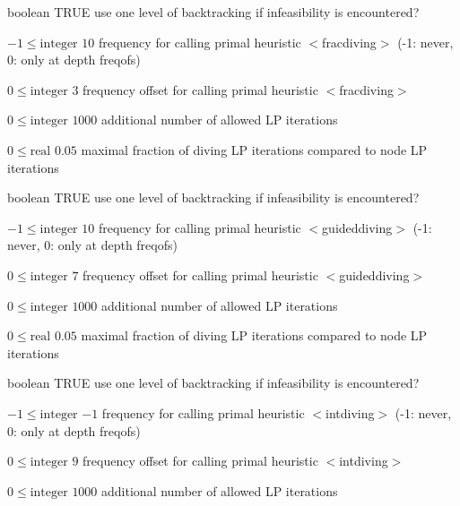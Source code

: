 %
{boolean}%
{TRUE}%
{use one level of backtracking if infeasibility is encountered?}%
{}

%
{$-1\leq\textrm{integer}$}%
{$10$}%
{frequency for calling primal heuristic $<$fracdiving$>$ (-1: never, 0: only at depth freqofs)}%
{}

%
{$0\leq\textrm{integer}$}%
{$3$}%
{frequency offset for calling primal heuristic $<$fracdiving$>$}%
{}

%
{$0\leq\textrm{integer}$}%
{$1000$}%
{additional number of allowed LP iterations}%
{}

%
{$0\leq\textrm{real}$}%
{$0.05$}%
{maximal fraction of diving LP iterations compared to node LP iterations}%
{}

%
{boolean}%
{TRUE}%
{use one level of backtracking if infeasibility is encountered?}%
{}

%
{$-1\leq\textrm{integer}$}%
{$10$}%
{frequency for calling primal heuristic $<$guideddiving$>$ (-1: never, 0: only at depth freqofs)}%
{}

%
{$0\leq\textrm{integer}$}%
{$7$}%
{frequency offset for calling primal heuristic $<$guideddiving$>$}%
{}

%
{$0\leq\textrm{integer}$}%
{$1000$}%
{additional number of allowed LP iterations}%
{}

%
{$0\leq\textrm{real}$}%
{$0.05$}%
{maximal fraction of diving LP iterations compared to node LP iterations}%
{}

%
{boolean}%
{TRUE}%
{use one level of backtracking if infeasibility is encountered?}%
{}

%
{$-1\leq\textrm{integer}$}%
{$-1$}%
{frequency for calling primal heuristic $<$intdiving$>$ (-1: never, 0: only at depth freqofs)}%
{}

%
{$0\leq\textrm{integer}$}%
{$9$}%
{frequency offset for calling primal heuristic $<$intdiving$>$}%
{}

%
{$0\leq\textrm{integer}$}%
{$1000$}%
{additional number of allowed LP iterations}%
{}

